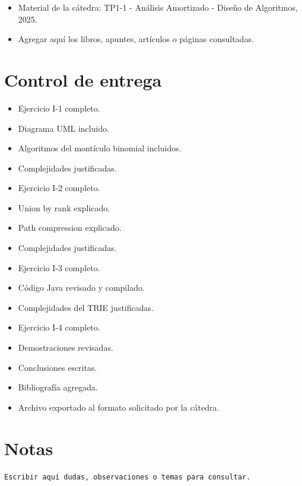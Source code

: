 \documentclass[11pt]{article}
\begin{document}
\begin{itemize}
\item Material de la cátedra: TP1-1 - Análisis Amortizado - Diseño de Algoritmos, 2025.
\item Agregar aquí los libros, apuntes, artículos o páginas consultadas.
\end{itemize}

\section{Control de entrega}
\label{sec:org2b6f2ac}

\begin{itemize}
\item[{$\square$}] Ejercicio I-1 completo.
\item[{$\square$}] Diagrama UML incluido.
\item[{$\square$}] Algoritmos del montículo binomial incluidos.
\item[{$\square$}] Complejidades justificadas.
\item[{$\square$}] Ejercicio I-2 completo.
\item[{$\square$}] Union by rank explicado.
\item[{$\square$}] Path compression explicado.
\item[{$\square$}] Complejidades justificadas.
\item[{$\square$}] Ejercicio I-3 completo.
\item[{$\square$}] Código Java revisado y compilado.
\item[{$\square$}] Complejidades del TRIE justificadas.
\item[{$\square$}] Ejercicio I-4 completo.
\item[{$\square$}] Demostraciones revisadas.
\item[{$\square$}] Conclusiones escritas.
\item[{$\square$}] Bibliografía agregada.
\item[{$\square$}] Archivo exportado al formato solicitado por la cátedra.
\end{itemize}

\section{Notas}
\label{sec:org5bfea1f}

\begin{verbatim}
Escribir aquí dudas, observaciones o temas para consultar.
\end{verbatim}
\end{document}
